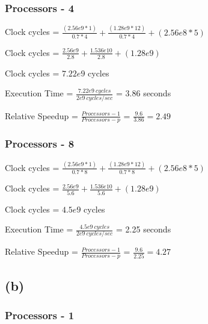 \documentclass{article}
\begin{document}
    \subsubsection*{Processors - 4}

    Clock cycles = $\frac{(2.56e9 * 1)}{0.7 * 4} + \frac{(1.28e9 * 12)}{0.7*4} + (2.56e8 * 5)$

    \vspace*{6pt}

    Clock cycles = $\frac{2.56e9}{2.8} + \frac{1.536e{10}}{2.8} + (1.28e9) $
    
    \vspace*{6pt}

    Clock cycles = $7.22e9$ cycles
    \vspace*{6pt}
    
    Execution Time = $\frac{7.22e9\ cycles}{2e9\ cycles/sec}$ = 3.86 seconds
    \vspace*{6pt}

    Relative Speedup = $\frac{Processors - 1}{Processors - p}$ = $\frac{9.6}{3.86} = 2.49 $

    \subsubsection*{Processors - 8}

    Clock cycles = $\frac{(2.56e9 * 1)}{0.7 * 8} + \frac{(1.28e9 * 12)}{0.7*8} + (2.56e8 * 5)$

    \vspace*{6pt}

    Clock cycles = $\frac{2.56e9}{5.6} + \frac{1.536e{10}}{5.6} + (1.28e9) $
    
    \vspace*{6pt}

    Clock cycles = $4.5e9$ cycles
    \vspace*{6pt}
    
    Execution Time = $\frac{4.5e9\ cycles}{2e9\ cycles/sec}$ = 2.25 seconds
    \vspace*{6pt}

    Relative Speedup = $\frac{Processors - 1}{Processors - p}$ = $\frac{9.6}{2.25} = 4.27 $

    \subsection*{(b)}

    \subsubsection*{Processors - 1}
\end{document}
